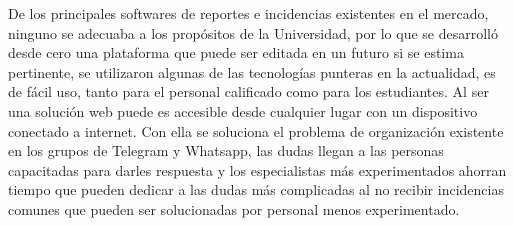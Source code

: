 \begin{conclusions}
    De los principales softwares de reportes e incidencias existentes en el mercado, ninguno se adecuaba a los propósitos de la Universidad, por lo que se desarrolló desde cero una plataforma que puede ser editada en un futuro si se estima pertinente, se utilizaron algunas de las tecnologías punteras en la actualidad, es de fácil uso, tanto para el personal calificado como para los estudiantes. Al ser una solución web puede es accesible desde cualquier lugar con un dispositivo conectado a internet. Con ella se soluciona el problema de organización existente en los grupos de Telegram y Whatsapp, las dudas llegan a las personas capacitadas para darles respuesta y los especialistas más experimentados ahorran tiempo que pueden dedicar a las dudas más complicadas al no recibir incidencias comunes que pueden ser solucionadas por personal menos experimentado. 
\end{conclusions}
